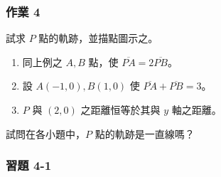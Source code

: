 \subsubsection*{作業 4}
試求 $P$ 點的軌跡，並描點圖示之。
\begin{enumerate}[label=\roman*), leftmargin=2em]
  \item 同上例之 $A, B$ 點，使 $\overline{PA} = 2\overline{PB}$。
  \item 設 $A(-1, 0), B(1, 0)$ 使 $\overline{PA} + \overline{PB} = 3$。
  \item $P$ 與 $(2, 0)$ 之距離恒等於其與 $y$ 軸之距離。
\end{enumerate}
試問在各小題中，$P$ 點的軌跡是一直線嗎？

\subsubsection*{習題 4-1}

